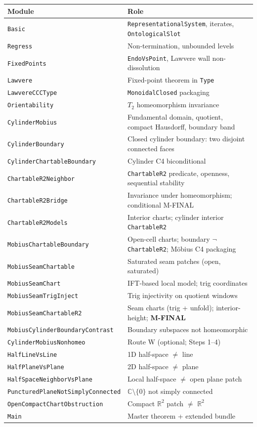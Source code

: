 \documentclass[11pt]{article}
\newcommand{\leanref}[1]{\texttt{\small #1}}
\begin{document}
\begin{table}[h]
\centering
\small
\begin{tabular}{@{}lp{8cm}@{}}
\toprule
\textbf{Module} & \textbf{Role} \\
\midrule
\leanref{Basic} & \leanref{RepresentationalSystem}, iterates, \leanref{OntologicalSlot} \\
\leanref{Regress} & Non-termination, unbounded levels \\
\leanref{FixedPoints} & \leanref{EndoVsPoint}, Lawvere wall non-dissolution \\
\leanref{Lawvere} & Fixed-point theorem in \texttt{Type} \\
\leanref{LawvereCCCType} & \texttt{MonoidalClosed} packaging \\
\leanref{Orientability} & $T_2$ homeomorphism invariance \\
\leanref{CylinderMobius} & Fundamental domain, quotient, compact Hausdorff, boundary band \\
\leanref{CylinderBoundary} & Closed cylinder boundary: two disjoint connected faces \\
\leanref{CylinderChartableBoundary} & Cylinder C4 biconditional \\
\leanref{ChartableR2Neighbor} & \leanref{ChartableR2} predicate, openness, sequential stability \\
\leanref{ChartableR2Bridge} & Invariance under homeomorphism; conditional M-FINAL \\
\leanref{ChartableR2Models} & Interior charts; cylinder interior \leanref{ChartableR2} \\
\leanref{MobiusChartableBoundary} & Open-cell charts; boundary $\neg$\leanref{ChartableR2}; M\"obius C4 packaging \\
\leanref{MobiusSeamChartable} & Saturated seam patches (open, saturated) \\
\leanref{MobiusSeamChart} & IFT-based local model; trig coordinates \\
\leanref{MobiusSeamTrigInject} & Trig injectivity on quotient windows \\
\leanref{MobiusSeamChartableR2} & Seam charts (trig + unfold); interior-height; \textbf{M-FINAL} \\
\leanref{MobiusCylinderBoundaryContrast} & Boundary subspaces not homeomorphic \\
\leanref{CylinderMobiusNonhomeo} & Route W (optional; Steps 1--4) \\
\leanref{HalfLineVsLine} & 1D half-space $\neq$ line \\
\leanref{HalfPlaneVsPlane} & 2D half-space $\neq$ plane \\
\leanref{HalfSpaceNeighborVsPlane} & Local half-space $\neq$ open plane patch \\
\leanref{PuncturedPlaneNotSimplyConnected} & $\mathbb{C} \setminus \{0\}$ not simply connected \\
\leanref{OpenCompactChartObstruction} & Compact $\mathbb{R}^2$ patch $\neq$ $\mathbb{R}^2$ \\
\leanref{Main} & Master theorem + extended bundle \\
\bottomrule
\end{tabular}
\end{table}
\end{document}
